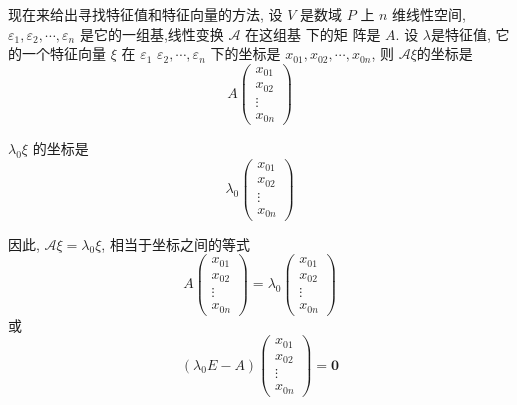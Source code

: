 \documentclass[13pt]{beamer}
\def\A{\mathscr{A}}
\begin{document}
\begin{frame}
现在来给出寻找特征值和特征向量的方法, 设 $V$ 是数域 $P$ 上 $n$ 维线性空间, ${\varepsilon}_{1}, {\varepsilon}_{2}, \cdots, {\varepsilon}_{n}$ 是它的一组基,线性变换 $\A$ 在这组基
下的矩 阵是 $A$. 设 $\lambda$是特征值, 它的一个特征向量 ${\xi}$ 在 ${\varepsilon}_{1}$ ${\varepsilon}_{2}, \cdots, {\varepsilon}_{n}$ 下的坐标是 $x_{01}, x_{02}, \cdots, x_{0 n}$, 则 $\A \xi$的坐标是
\[
A\left(\begin{array}{c}
x_{01} \\
x_{02} \\
\vdots \\
x_{0 n}
\end{array}\right)
\]


$\lambda_{0} \xi$ 的坐标是
\[
\lambda_{0}\left(\begin{array}{l}
x_{01} \\
x_{02} \\
\vdots \\
x_{0 n}
\end{array}\right)
\]

\end{frame}



\begin{frame}
因此, $\A \xi=\lambda_{0} \xi$, 相当于坐标之间的等式
\[
{A}\left(\begin{array}{c}
x_{01} \\
x_{02} \\
\vdots \\
x_{0 n}
\end{array}\right)=\lambda_{0}\left(\begin{array}{c}
x_{01} \\
x_{02} \\
\vdots \\
x_{0 n}
\end{array}\right)
\]
或
\[
\left(\lambda_{0} {E}-{A}\right)\left(\begin{array}{c}
x_{01} \\
x_{02} \\
\vdots \\
x_{0 n}
\end{array}\right)=\mathbf{0} \tag{*} \label{eq-*}
\]
\end{frame}
\end{document}
